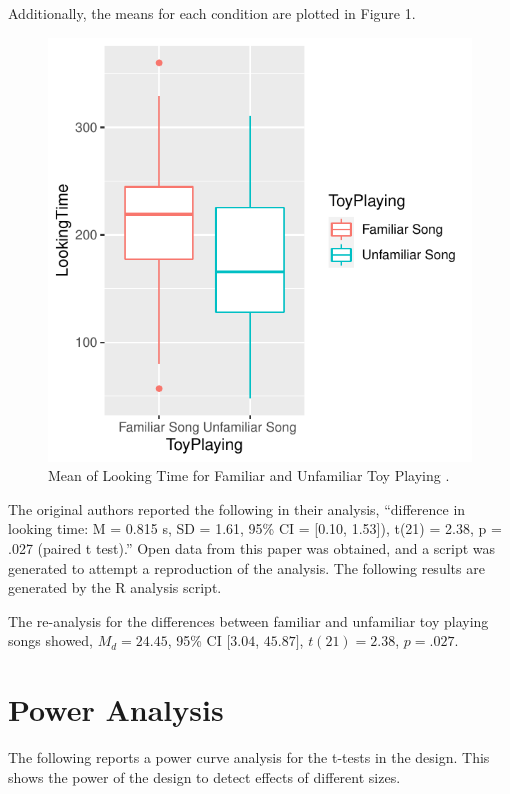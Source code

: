 \documentclass[
  english,
  man]{apa6}
\begin{document}
Additionally, the means for each condition are plotted in Figure 1.

\begin{figure}
\centering
\includegraphics{SemesterProject_files/figure-latex/unnamed-chunk-2-1.pdf}
\caption{\label{fig:unnamed-chunk-2}Mean of Looking Time for Familiar and Unfamiliar Toy Playing .}
\end{figure}

The original authors reported the following in their analysis, \enquote{difference in looking time: M = 0.815 s, SD = 1.61, 95\% CI = {[}0.10, 1.53{]}), t(21) = 2.38, p = .027 (paired t test).}
Open data from this paper was obtained, and a script was generated to attempt a reproduction of the analysis. The following results are generated by the R analysis script.

The re-analysis for the differences between familiar and unfamiliar toy playing songs showed, \(M_d = 24.45\), 95\% CI \([3.04\), \(45.87]\), \(t(21) = 2.38\), \(p = .027\).

\hypertarget{power-analysis}{%
\section{Power Analysis}\label{power-analysis}}

The following reports a power curve analysis for the t-tests in the design. This shows the power of the design to detect effects of different sizes.
\end{document}
